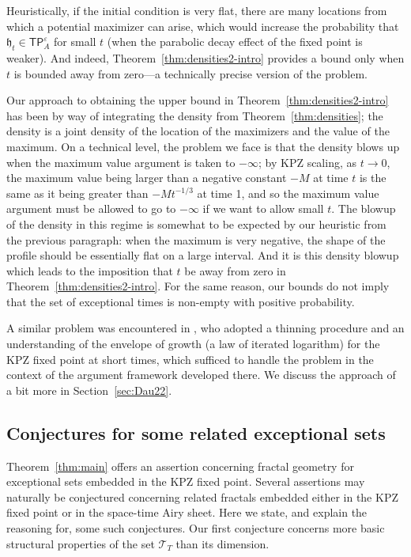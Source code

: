 \documentclass[oneside,final,11pt]{amsart}
\theoremstyle{definition}
\newcommand{\fh}{\mathfrak{h}}
\newcommand{\TP}[1]{\mathsf{TP}_{\!\!#1}}
\newcommand{\CT}{\mathcal{T}}
\newcommand{\1}[1]{\mathbf{1}_{#1}}
\newcommand{\eps}{\varepsilon}
\let\emptyset\varnothing
\numberwithin{equation}{section}
\begin{document}
Heuristically, if the initial condition is very flat, there are many locations from which a potential maximizer can arise, which would increase the probability that $\fh_t\in\TP{A}^{\eps}$ for small $t$ (when the parabolic decay effect of the fixed point is weaker). And indeed, Theorem~\ref{thm:densities2-intro} provides a bound only when $t$ is bounded away from zero---a technically precise version of the problem.

Our approach to obtaining the upper bound in Theorem~\ref{thm:densities2-intro} has been by way of integrating the density from Theorem~\ref{thm:densities}; the density is a joint density of the location of the maximizers and the value of the maximum.
On a technical level, the problem we face is that the density blows up when the maximum value argument is taken to $-\infty$; by KPZ scaling, as $t\to 0$, the maximum value being larger than a negative constant $-M$ at time $t$ is the same as it being greater than $-Mt^{-1/3}$ at time 1, and so the maximum value argument must be allowed to go to $-\infty$ if we want to allow small $t$. The blowup of the density in this regime is somewhat to be expected by our heuristic from the previous paragraph: when the maximum is very negative, the shape of the profile should be essentially flat on a large interval. And it is this density blowup which leads to the imposition that $t$ be away from zero in Theorem~\ref{thm:densities2-intro}. For the same reason, our bounds do not imply that the set of exceptional times is non-empty with positive probability.

A similar problem was encountered in \cite{dauvergne2022non}, who adopted a thinning procedure and an understanding of the envelope of growth (a law of iterated logarithm) for the KPZ fixed point at short times, which sufficed to handle the problem in the context of the argument framework developed there. We discuss the approach of \cite{dauvergne2022non} a bit more in Section~\ref{sec:Dau22}.




\subsection{Conjectures for some related exceptional sets}
\label{sec:conjectures}

Theorem~\ref{thm:main} offers an assertion concerning fractal geometry for exceptional sets embedded in the KPZ fixed point. Several assertions may naturally be conjectured concerning related fractals embedded either in the KPZ fixed point or in the space-time Airy sheet. Here we state, and explain the reasoning for, some such conjectures.
Our first conjecture concerns more basic structural properties of the set $\CT_T$ than its dimension.%
\end{document}
